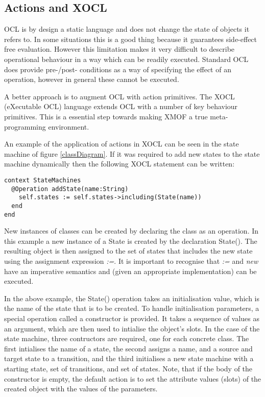 \subsection{Actions and XOCL}

OCL is by design a static language and does not change the state
of objects it refers to.  In some situations this is a good thing
because it guarantees side-effect free evaluation.  However this
limitation makes it very difficult to describe operational
behaviour in a way which can be readily executed.  Standard OCL
does provide pre-/post- conditions as a way of specifying the
effect of an operation, however in general these cannot be
executed.

A better approach is to augment OCL with action primitives. The
XOCL (eXecutable OCL) language extends OCL with a number of key
behaviour primitives. This is a essential step towards making XMOF
a true meta-programming environment.

An example of the application of actions in XOCL can be seen in
the state machine of figure \ref{classDiagram}. If it was required
to add new states to the state machine dynamically then the
following XOCL statement can be written:

\small
\begin{verbatim}
context StateMachines
  @Operation addState(name:String)
    self.states := self.states->including(State(name))
  end
end
\end{verbatim}
\normalsize

New instances of classes can be created by declaring the class as
an operation. In this example a new instance of a State is created
by the declaration State(). The resulting object is then assigned
to the set of states that includes the new state using the
assignment expression \emph{:=}. It is important to recognise that
\emph{:=} and \emph{new} have an imperative semantics and (given
an appropriate implementation) can be executed.

In the above example, the State() operation takes an
initialisation value, which is the name of the state that is to be
created. To handle initialisation parameters, a special operation
called a constructor is provided. It takes a sequence of values as
an argument, which are then used to intialise the object's slots.
In the case of the state machine, three contructors are required,
one for each concrete class. The first intialises the name of a
state, the second assigns a name, and a source and target state to
a transition, and the third initialises a new state machine with a
starting state, set of transitions, and set of states. Note, that
if the body of the constructor is empty, the default action is to
set the attribute values (slots) of the created object with the
values of the parameters.

